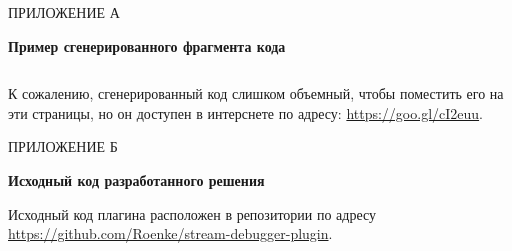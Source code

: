 \vfill
\clearpage
\appendix


    \hfill ПРИЛОЖЕНИЕ А
    \begin{center}
        \bf{Пример сгенерированного фрагмента кода}
    \end{center}
    \markboth{\MakeUppercase{}}{}
    
    \inputminted{java}{chapter4/code/Example.java}
    К сожалению, сгенерированный код слишком объемный, чтобы поместить его на эти страницы, но он доступен в интерснете по адресу:
    \href{https://goo.gl/cI2euu}{https://goo.gl/cI2euu}.
    
\vfill
\clearpage
\appendix
{}
    \hfill ПРИЛОЖЕНИЕ Б
    \begin{center}
    	\bf{Исходный код разработанного решения}
    \end{center}
    \markboth{\MakeUppercase{}}{}
    
Исходный код плагина расположен в репозитории по адресу \\ \href{https://github.com/Roenke/stream-debugger-plugin}{https://github.com/Roenke/stream-debugger-plugin}.
    